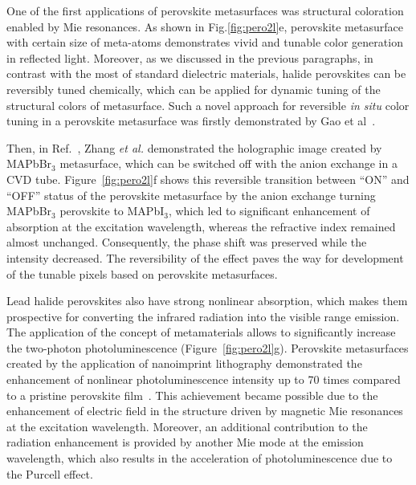 \documentclass[journal=chreay,manuscript=review]{achemso}
\begin{document}
One of the first applications of perovskite metasurfaces was structural coloration~\citep{gholipour2017organometallic} enabled by Mie resonances. As shown in Fig.\ref{fig:pero2l}e, perovskite metasurface with certain size of meta-atoms demonstrates vivid and tunable color generation in reflected light. Moreover, as we discussed in the previous paragraphs, in contrast with the most of standard dielectric materials, halide perovskites can be reversibly tuned chemically, which can be applied for dynamic tuning of the structural colors of metasurface. 
Such a novel approach for reversible \textit{in situ} color tuning in a perovskite metasurface was firstly demonstrated by Gao et al~\cite{gao2018lead}.

Then, in Ref.~, Zhang \textit{et al.} demonstrated the holographic image created by MAPbBr$_3$ metasurface, which can be switched off with the anion exchange in a CVD tube. Figure~\ref{fig:pero2l}f shows this reversible transition between “ON” and “OFF” status of the perovskite metasurface by the anion exchange turning MAPbBr$_3$ perovskite to MAPbI$_3$, which led to significant enhancement of absorption at the excitation wavelength, whereas the refractive index remained almost unchanged. Consequently, the phase shift was preserved while the intensity decreased. The reversibility of the effect paves the way for development of the tunable pixels based on perovskite metasurfaces.


Lead halide perovskites also have strong nonlinear absorption\cite{walters2015two,xu2020halide}, which makes them prospective for converting the infrared radiation into the visible range emission. The application of the concept of metamaterials allows to significantly increase the two-photon photoluminescence (Figure~\ref{fig:pero2l}g). Perovskite metasurfaces created by the application of nanoimprint lithography demonstrated the enhancement of nonlinear photoluminescence intensity up to 70 times compared to a pristine perovskite film~\cite{makarov2017multifold}. This achievement became possible due to the enhancement of electric field in the structure driven by magnetic Mie resonances at the excitation wavelength. Moreover, an additional contribution to the radiation enhancement is provided by another Mie mode at the emission wavelength, which also results in the acceleration of photoluminescence due to the Purcell effect. 
\end{document}
